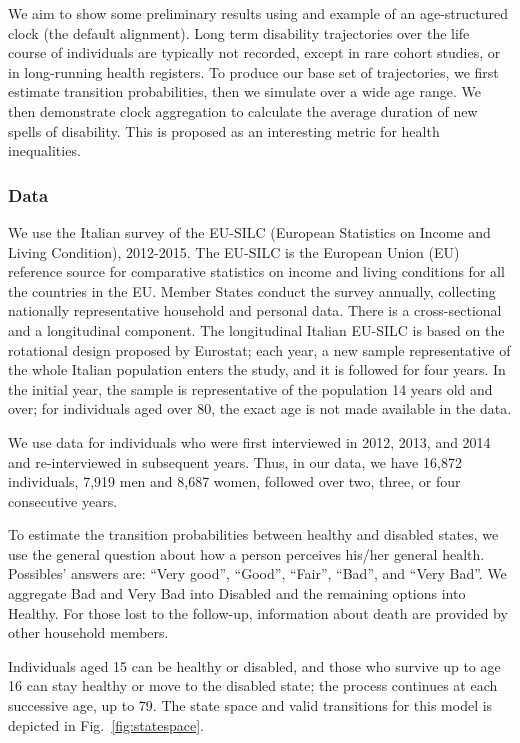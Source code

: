 \documentclass{article}
\begin{document}
We aim to show some preliminary results using and example of an age-structured clock (the default alignment).
Long term disability trajectories over the life course of individuals are typically not recorded, except in rare cohort studies, or in long-running health registers. To produce our base set of trajectories, we first estimate transition probabilities, then we simulate over a wide age range. We then demonstrate clock aggregation to calculate the average duration of new spells of disability. This is proposed as an interesting metric for health inequalities.

\subsubsection{Data}
We use the Italian survey of the EU-SILC (European Statistics on Income and Living Condition), 2012-2015. The EU-SILC is the European Union (EU) reference source for comparative statistics on income and living conditions for all the countries in the EU. Member States conduct the survey annually, collecting nationally representative household and personal data. There is a cross-sectional and a longitudinal component. The longitudinal Italian EU-SILC is based on the rotational design proposed by Eurostat; each year, a new sample representative of the whole Italian population enters the study, and it is followed for four years. In the initial year, the sample is representative of the population 14 years old and over; for individuals aged over 80, the exact age is not made available in the data.

We use data for individuals who were first interviewed in 2012, 2013, and 2014 and re-interviewed in subsequent years. Thus, in our data, we have 16,872 individuals, 7,919 men and 8,687 women, followed over two, three, or four consecutive years.  

To estimate the transition probabilities between healthy and disabled states, we use the general question about how a person perceives his/her general health. Possibles' answers are: ``Very good'', ``Good'', ``Fair'', ``Bad'', and ``Very Bad''. We aggregate Bad and Very Bad into Disabled and the remaining options into Healthy. For those lost to the follow-up, information about death are provided by other household members.

Individuals aged 15 can be healthy or disabled, and those who survive up to age 16 can stay healthy or move to the disabled state; the process continues at each successive age, up to 79. The state space and valid transitions for this model is depicted in Fig.~\ref{fig:statespace}.
\end{document}
